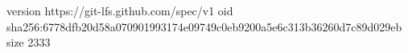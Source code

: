 version https://git-lfs.github.com/spec/v1
oid sha256:6778dfb20d58a070901993174e09749c0eb9200a5e6c313b36260d7c89d029eb
size 2333
